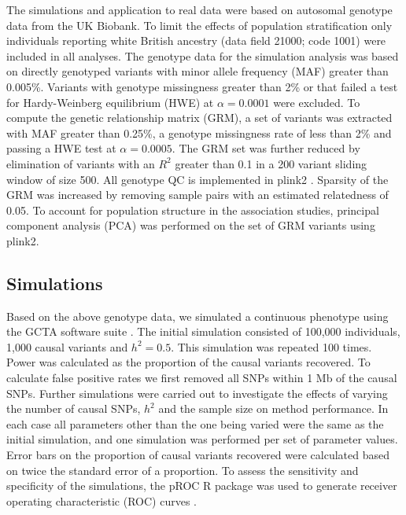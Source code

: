 \documentclass[doublespacing]{bmcart}
\begin{document}
The simulations and application to real data were based on autosomal genotype data from the UK Biobank. To limit the effects of population stratification only individuals reporting white British ancestry (data field 21000; code 1001) were included in all analyses. The genotype data for the simulation analysis was based on directly genotyped variants with minor allele frequency (MAF) greater than 0.005\%. Variants with genotype missingness greater than 2\% or that failed a test for Hardy-Weinberg equilibrium (HWE) at $\alpha{=0.0001}$ were excluded. To compute the genetic relationship matrix (GRM), a set of variants was extracted with MAF greater than 0.25\%, a genotype missingness rate of less than 2\% and passing a HWE test at $\alpha{=0.0005}$. The GRM set was further reduced by elimination of variants with an $R^2$ greater than 0.1 in a 200 variant sliding window of size 500. All genotype QC is implemented in plink2 \cite{chang2015second}. Sparsity of the GRM was increased by removing sample pairs with an estimated relatedness of 0.05. To account for population structure in the association studies, principal component analysis (PCA) was performed on the set of GRM variants using plink2.

\subsection*{Simulations} 
Based on the above genotype data, we simulated a continuous phenotype using the GCTA software suite \cite{yang2011gcta}. The initial simulation consisted of 100,000 individuals, 1,000 causal variants and $h^2 = 0.5$. This simulation was repeated 100 times. Power was calculated as the proportion of the causal variants recovered. To calculate false positive rates we first removed all SNPs within 1 Mb of the causal SNPs. Further simulations were carried out to investigate the effects of varying the number of causal SNPs, $h^2$ and the sample size on method performance. In each case all parameters other than the one being varied were the same as the initial simulation, and one simulation was performed per set of parameter values. Error bars on the proportion of causal variants recovered were calculated based on twice the standard error of a proportion. To assess the sensitivity and specificity of the simulations, the pROC R package was used to generate receiver operating characteristic (ROC) curves \cite{robin2011proc}. 
\end{document}
